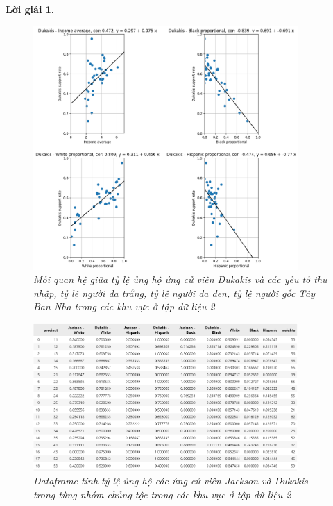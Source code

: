 \documentclass[14pt, a4paper]{article}
\theoremstyle{sltheorem}
\theoremstyle{soltheorem}
\newtheorem*{loigiai}{Lời giải}
\begin{document}
\begin{loigiai}
\begin{enumerate}
    \begin{figure}[H]
        \centering
        \includegraphics[width=0.9\textwidth]{figures/Dukakis_candidate_relationship_factor.png}
        \caption{Mối quan hệ giữa tỷ lệ ủng hộ ứng cử viên Dukakis và các yếu tố thu nhập, tỷ lệ người da trắng, tỷ lệ người da đen, tỷ lệ người gốc Tây Ban Nha trong các khu vực ở tập dữ liệu 2}
        \label{fig:Dukakis_candidate_relationship_factor}
    \end{figure}

    \begin{figure}[H]
        \centering
        \includegraphics[width=0.9\textwidth]{figures/support_rate_df.png}
        \caption{Dataframe tính tỷ lệ ủng hộ các ứng cử viên Jackson và Dukakis trong từng nhóm chủng tộc trong các khu vực ở tập dữ liệu 2}
        \label{fig:support_rate_df}
    \end{figure}


\end{enumerate}
\end{loigiai}
\end{document}
